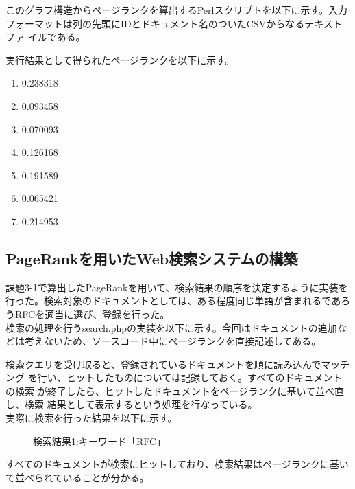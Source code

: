 \documentclass[a4paper,9pt]{jsarticle}
\begin{document}
このグラフ構造からページランクを算出するPerlスクリプトを以下に示す。入力
フォーマットは列の先頭にIDとドキュメント名のついたCSVからなるテキストファ
イルである。



実行結果として得られたページランクを以下に示す。
\begin{enumerate}
 \item	0.238318
 \item 	0.093458
 \item 	0.070093
 \item 	0.126168
 \item 	0.191589
 \item 	0.065421
 \item 	0.214953
\end{enumerate}

\subsection{PageRankを用いたWeb検索システムの構築}
課題3-1で算出したPageRankを用いて、検索結果の順序を決定するように実装を
行った。検索対象のドキュメントとしては、ある程度同じ単語が含まれるであろ
うRFCを適当に選び、登録を行った。\\

検索の処理を行うsearch.phpの実装を以下に示す。今回はドキュメントの追加な
どは考えないため、ソースコード中にページランクを直接記述してある。


検索クエリを受け取ると、登録されているドキュメントを順に読み込んでマッチング
を行い、ヒットしたものについては記録しておく。すべてのドキュメントの検索
が終了したら、ヒットしたドキュメントをページランクに基いて並べ直し、検索
結果として表示するという処理を行なっている。\\

実際に検索を行った結果を以下に示す。


\begin{figure}[H]
 \caption{検索結果1:キーワード「RFC」}
 \begin{center}
 \end{center}
\end{figure}
すべてのドキュメントが検索にヒットしており、検索結果はページランクに基い
て並べられていることが分かる。
\end{document}
